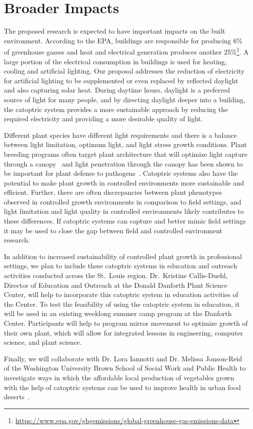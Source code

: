 \section{Broader Impacts}
\label{sec:broader}

The proposed research is expected to have important impacts on the built environment.
According to the EPA, buildings are responsible for producing 6\% of
greenhouse gasses and heat and electrical generation produces another
25\%\footnote{\url{https://www.epa.gov/ghgemissions/global-greenhouse-gas-emissions-data}}.
A large portion of the electrical consumption in buildings is used for
heating, cooling and artificial lighting. Our proposal addresses the
reduction of electricity for artificial lighting to be supplemented or even
replaced by
reflected daylight and also capturing solar heat. During daytime hours,
daylight is a preferred source of light for many people, and by
directing daylight deeper into a building, the catoptric system
provides a more sustainable approach by reducing the required electricity
and providing a more desirable quality of light.

Different plant species have
different light requirements and there is a balance between light limitation,
optimum light, and light stress growth conditions. Plant breeding programs
often target plant architecture that will optimize light capture through a
canopy~\cite{burgess17} and light penetration through the canopy has been
shown to be important for plant defense to pathogens~\cite{ballare12}.
Catoptric systems also have the potential to make plant growth in controlled
environments more sustainable and efficient.
Further, there are often discrepancies between plant phenotypes observed
in controlled growth environments in comparison to field settings,
and light limitation and light quality in controlled environments likely
contributes to these differences. If catoptric systems can capture and
better mimic field settings it may be used to close the gap between field
and controlled environment research.

In addition to increased sustainability of controlled plant growth in
professional
settings, we plan to include these catoptric systems in education and
outreach activities conducted across the St.~Louis region. Dr.~Kristine
Callis-Duehl, Director of Education and Outreach at the Donald Danforth
Plant Science Center, 
will help to incorporate this catoptric system in education
activities of the Center. To test the feasibility of using
the catoptric system in education, it will be used in an
existing weeklong summer camp program at the Danforth Center. Participants will
help to program mirror movement to optimize growth of their own plant, which
will allow for integrated lessons in engineering, computer science, and plant
science.  

Finally, we will collaborate with Dr. Lora Iannotti and Dr. Melissa Jonson-Reid
of the Washington University
Brown School of Social Work and Public Health to investigate ways in which
the affordable local production of
vegetables grown with the help of catoptric systems can be used to improve
health in urban food deserts~\cite{Walker10}.

